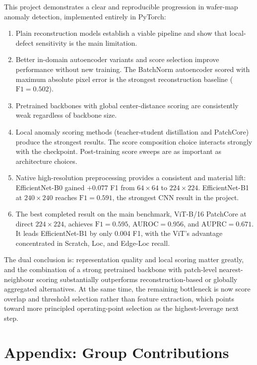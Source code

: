 \documentclass[11pt]{article}
\begin{document}
This project demonstrates a clear and reproducible progression in wafer-map
anomaly detection, implemented entirely in PyTorch:

\begin{enumerate}[leftmargin=1.5em]
  \item Plain reconstruction models establish a viable pipeline and show that
        local-defect sensitivity is the main limitation.
  \item Better in-domain autoencoder variants and score selection improve
        performance without new training. The BatchNorm autoencoder scored with
        maximum absolute pixel error is the strongest reconstruction baseline
        ($\mathrm{F1}=0.502$).
  \item Pretrained backbones with global center-distance scoring are consistently
        weak regardless of backbone size.
  \item Local anomaly scoring methods (teacher-student distillation and
        PatchCore) produce the strongest results. The score composition
        choice interacts strongly with the checkpoint. Post-training score
        sweeps are as important as architecture choices.
  \item Native high-resolution preprocessing provides a consistent and material
        lift: EfficientNet-B0 gained $+0.077$ F1 from $64\!\times\!64$ to
        $224\!\times\!224$. EfficientNet-B1 at $240\!\times\!240$ reaches
        $\mathrm{F1}=0.591$, the strongest CNN result in the project.
  \item The best completed result on the main benchmark, ViT-B/16 PatchCore at
        direct $224\!\times\!224$, achieves $\mathrm{F1}=0.595$,
        $\mathrm{AUROC}=0.956$, and $\mathrm{AUPRC}=0.671$. It leads
        EfficientNet-B1 by only 0.004 F1, with the ViT's advantage concentrated
        in Scratch, Loc, and Edge-Loc recall.
\end{enumerate}

The dual conclusion is: representation quality and local scoring matter
greatly, and the combination of a strong pretrained backbone with patch-level
nearest-neighbour scoring substantially outperforms reconstruction-based
or globally aggregated alternatives.  At the same time, the remaining
bottleneck is now score overlap and threshold selection rather than feature
extraction, which points toward more principled operating-point selection as
the highest-leverage next step.

\appendix
\newpage
\section{Appendix: Group Contributions}
\label{app:contributions}
\end{document}
